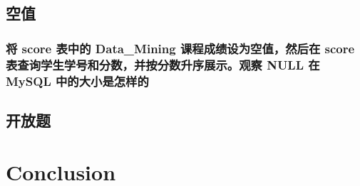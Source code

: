 \documentclass{ctexart}
\begin{document}
\subsection{空值}
\subsubsection{将 score 表中的 Data\_Mining 课程成绩设为空值，然后在 score 表查询学生学号和分数，并按分数升序展示。观察 NULL 在 MySQL 中的大小是怎样的}
\subsection{开放题}
\subsubsection{}
\subsubsection{}

	\section{Conclusion}
    
\end{document}
